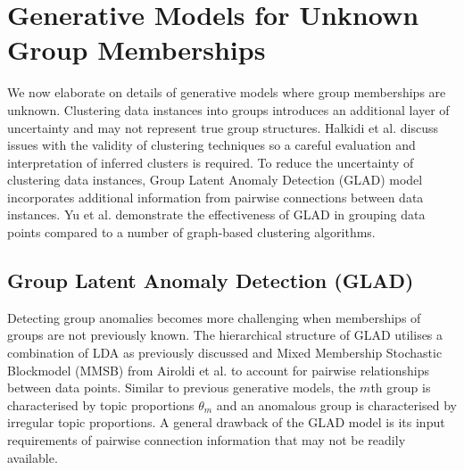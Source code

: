 \section{Generative Models for Unknown Group Memberships}
We now elaborate on details of generative models where group memberships are unknown.   Clustering data instances into groups introduces an additional layer of  uncertainty and may not represent true group structures. Halkidi et al. \cite{ClusterValidity} discuss issues with the validity of clustering techniques %
so a careful evaluation and interpretation of inferred clusters is required. %
 To reduce the uncertainty of clustering data instances, Group Latent Anomaly Detection (GLAD) model \cite{GLAD} incorporates additional information from pairwise connections between data instances. %
  Yu et al. \cite{GLAD} demonstrate the effectiveness of  GLAD in grouping data points compared to a number of graph-based clustering algorithms.



\subsection{ Group Latent Anomaly Detection (GLAD)} \label{subs:GLAD}
Detecting group anomalies becomes more challenging when memberships of groups are not previously known.  The  hierarchical structure  of GLAD utilises a combination of LDA as previously discussed and Mixed Membership Stochastic Blockmodel (MMSB) from Airoldi et al.  \cite{MMSB} to account for pairwise relationships between data points.  Similar to previous generative models, the $m$th group  is characterised by  topic proportions $\theta_{m}$ and an anomalous group is characterised by irregular topic proportions. %
A general drawback of the GLAD model is its input requirements of pairwise connection information that may not be readily available. 

